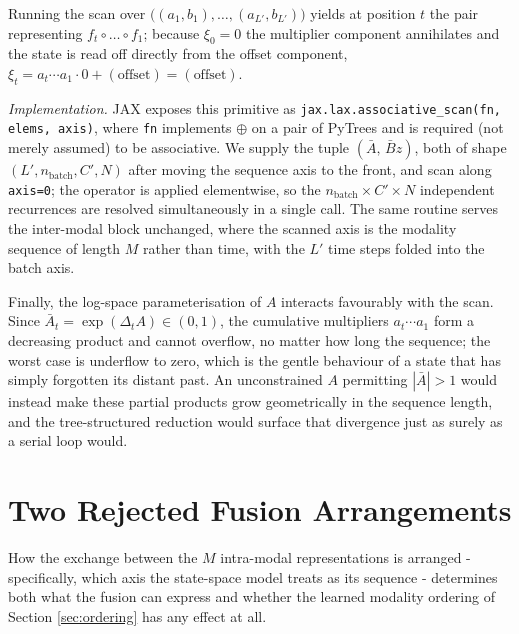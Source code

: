\documentclass[10pt,a4paper,twocolumn]{article}
\begin{document}
	Running the scan over $\bigl((a_1,b_1),\dots,(a_{L'},b_{L'})\bigr)$ yields at position $t$ the pair representing $f_t \circ \dots \circ f_1$; because $\xi_0 = 0$ the multiplier component annihilates and the state is read off directly from the offset component, $\xi_t = a_{t}\cdots a_1 \cdot 0 + (\text{offset}) = (\text{offset})$.
		
	\begin{sloppypar}\textit{Implementation.} JAX exposes this primitive as \texttt{jax.lax.associative\_scan}\allowbreak\texttt{(fn, elems, axis)}, where \texttt{fn} implements $\oplus$ on a pair of PyTrees and is required (not merely assumed) to be associative. We supply the tuple $(\bar{A},\, \bar{B} z)$, both of shape $(L', n_{\text{batch}}, C', N)$ after moving the sequence axis to the front, and scan along \texttt{axis=0}; the operator is applied elementwise, so the $n_{\text{batch}} \times C' \times N$ independent recurrences are resolved simultaneously in a single call. The same routine serves the inter-modal block unchanged, where the scanned axis is the modality sequence of length $M$ rather than time, with the $L'$ time steps folded into the batch axis.\end{sloppypar}
		
		Finally, the log-space parameterisation of $A$ interacts favourably with the scan. Since $\bar{A}_t = \exp(\Delta_t A) \in (0,1)$, the cumulative multipliers $a_t \cdots a_1$ form a decreasing product and cannot overflow, no matter how long the sequence; the worst case is underflow to zero, which is the gentle behaviour of a state that has simply forgotten its distant past. An unconstrained $A$ permitting $|\bar{A}| > 1$ would instead make these partial products grow geometrically in the sequence length, and the tree-structured reduction would surface that divergence just as surely as a serial loop would.


	\section{Two Rejected Fusion Arrangements}
	\label{app:arrangements}
	How the exchange between the $M$ intra-modal representations is arranged - specifically, which axis the state-space model treats as its sequence - determines both what the fusion can express and whether the learned modality ordering of Section \ref{sec:ordering} has any effect at all.
\end{document}
